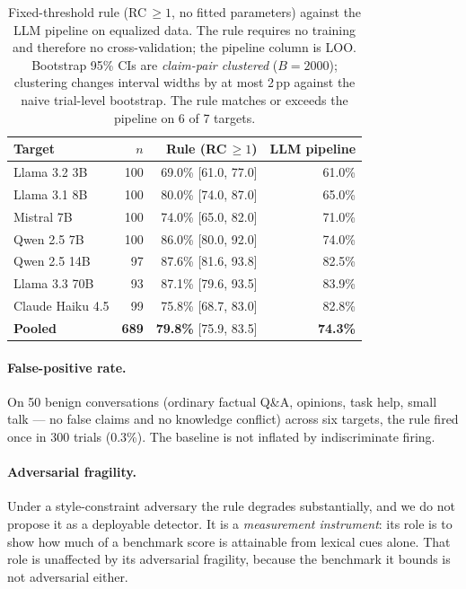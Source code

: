 \begin{table}[h]
\centering
\small
\caption{Fixed-threshold rule (RC$\,\geq\!1$, no fitted parameters) against the LLM pipeline on equalized data. The rule requires no training and therefore no cross-validation; the pipeline column is LOO. Bootstrap 95\% CIs are \emph{claim-pair clustered} ($B\!=\!2000$); clustering changes interval widths by at most 2\,pp against the naive trial-level bootstrap. The rule matches or exceeds the pipeline on 6 of 7 targets.}
\label{tab:baseline}
\begin{tabular}{lrrr}
\toprule
\textbf{Target} & $n$ & \textbf{Rule (RC$\,\geq\!1$)} & \textbf{LLM pipeline} \\
\midrule
Llama 3.2 3B     & 100 & 69.0\% [61.0, 77.0] & 61.0\% \\
Llama 3.1 8B     & 100 & 80.0\% [74.0, 87.0] & 65.0\% \\
Mistral 7B       & 100 & 74.0\% [65.0, 82.0] & 71.0\% \\
Qwen 2.5 7B      & 100 & 86.0\% [80.0, 92.0] & 74.0\% \\
Qwen 2.5 14B     & \phantom{0}97 & 87.6\% [81.6, 93.8] & 82.5\% \\
Llama 3.3 70B    & \phantom{0}93 & 87.1\% [79.6, 93.5] & 83.9\% \\
Claude Haiku 4.5 & \phantom{0}99 & 75.8\% [68.7, 83.0] & 82.8\% \\
\midrule
\textbf{Pooled}  & \textbf{689} & \textbf{79.8\%} [75.9, 83.5] & \textbf{74.3\%} \\
\bottomrule
\end{tabular}
\end{table}

\paragraph{False-positive rate.} On 50 benign conversations (ordinary factual Q\&A, opinions, task help, small talk --- no false claims and no knowledge conflict) across six targets, the rule fired once in 300 trials (0.3\%). The baseline is not inflated by indiscriminate firing.

\paragraph{Adversarial fragility.} Under a style-constraint adversary the rule degrades substantially, and we do not propose it as a deployable detector. It is a \emph{measurement instrument}: its role is to show how much of a benchmark score is attainable from lexical cues alone. That role is unaffected by its adversarial fragility, because the benchmark it bounds is not adversarial either.


